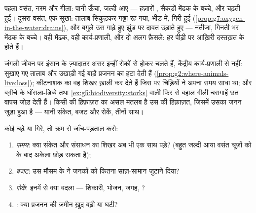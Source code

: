 \begin{example}[तालाब पर दो वसंत]\label{ex:g8:reproduction-and-environment:twosprings}
पहला वसंत, नरम और गीला: पानी ऊँचा,  जल्दी आए --- हज़ारों ,
सैकड़ों मेंढक के बच्चे, और  चढ़ती हुई। दूसरा वसंत, एक सूखा: तालाब
सिकुड़कर गड्ढा रह गया,  भीड़ में,  गिरी हुई
(\cref{prop:g7:oxygen-in-the-water:drains}), और बगुले उस गाढ़े हुए
झुंड पर दावत उड़ाते हुए --- नतीजा, गिनती भर मेंढक के बच्चे। वही मेंढक,
वही कार्य-प्रणाली, और दो अलग फ़ैसले: हर पीढ़ी पर आख़िरी दस्तख़त
 के होते हैं।
\end{example}

\begin{remark}[इंसान रोकें खिसका देते हैं]\label{rem:g8:reproduction-and-environment:humans}
जंगली जीवन पर इंसान के ज़्यादातर असर इन्हीं रोकों से होकर चलते हैं,
केंद्रीय कार्य-प्रणाली से नहीं: सुखाए गए तालाब और उखाड़ी गई बाड़ें
प्रजनन का  हटा देती हैं
(\cref{prop:g2:where-animals-live:loss}); कीटनाशक  का वह शिखर
ख़ाली कर देते हैं जिस पर चिड़ियों ने अपना समय साधा था; और बग़ीचे के
घोंसला-डिब्बे तथा \cref{ex:g5:biodiversity:storks} वाली फिर से बहाल गीली
चरागाहें छत वापस जोड़ देती हैं। किसी  की हिफ़ाज़त का असल मतलब है
उस  की हिफ़ाज़त, जिसमें उसका जनन जुड़ा हुआ है --- यानी संकेत,
बजट और रोकें, तीनों साथ।
\end{remark}

\begin{method}[आबादी के बदलाव की जाँच-पड़ताल]\label{met:g8:reproduction-and-environment:audit}
कोई  चढ़े या गिरे, तो क्रम से जाँच-पड़ताल करो:
\begin{enumerate}
  \item \emph{समय}: क्या संकेत और संसाधन का शिखर अब भी एक साथ पड़े?
        (बहुत जल्दी आया वसंत चूज़ों को  के बाद अकेला छोड़
        सकता है);
  \item \emph{बजट}: उस मौसम के  ने जनकों को कितना साज़-सामान
        जुटाने दिया?
  \item \emph{रोकें}: इनमें से क्या बदला --- शिकारी, भोजन, जगह,
        ?
  \item \emph{}: क्या प्रजनन की ज़मीन ख़ुद बढ़ी या घटी?
\end{enumerate}
\end{method}

